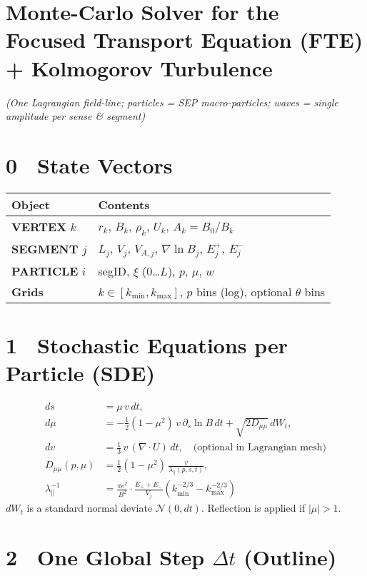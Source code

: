 {\section*{Monte-Carlo Solver for the Focused Transport Equation (FTE) + Kolmogorov Turbulence}

\textit{(One Lagrangian field-line; particles = SEP macro-particles; waves = single amplitude per sense \& segment)}

\section*{0 State Vectors}

\begin{tabular}{@{}ll@{}}
\toprule
\textbf{Object} & \textbf{Contents} \\
\midrule
\textbf{VERTEX} $k$ & $r_k$, $B_k$, $\rho_k$, $U_k$, $A_k = B_0/B_k$ \\
\textbf{SEGMENT} $j$ & $L_j$, $V_j$, $V_{A,j}$, $\nabla \ln B_j$, $E^+_j$, $E^-_j$ \\
\textbf{PARTICLE} $i$ & segID, $\xi$ (0…$L$), $p$, $\mu$, $w$ \\
\textbf{Grids} & $k \in [k_{\min}, k_{\max}]$, $p$ bins (log), optional $\theta$ bins \\
\bottomrule
\end{tabular}

\section*{1 Stochastic Equations per Particle (SDE)}

\[
\boxed{
\begin{aligned}
ds &= \mu\,v\,dt, \\
d\mu &= -\tfrac{1}{2}(1-\mu^2)\,v\,\partial_s \ln B\,dt + \sqrt{2D_{\mu\mu}}\,dW_t, \\
dv &= \tfrac{1}{3}\,v\,(\nabla \cdot U)\,dt, \quad \text{(optional in Lagrangian mesh)} \\
D_{\mu\mu}(p,\mu) &= \frac{1}{2}(1 - \mu^2)\,\frac{v}{\lambda_\parallel(p,s,t)}, \\
\lambda_\parallel^{-1} &= \frac{\pi e^2}{B^2} \cdot \frac{E_+ + E_-}{V_j} (k_{\min}^{-2/3} - k_{\max}^{-2/3})
\end{aligned}
}
\]
\smallskip
$dW_t$ is a standard normal deviate $\mathcal{N}(0,dt)$. Reflection is applied if $|\mu| > 1$.

\section*{2 One Global Step $\Delta t$ (Outline)}

}
